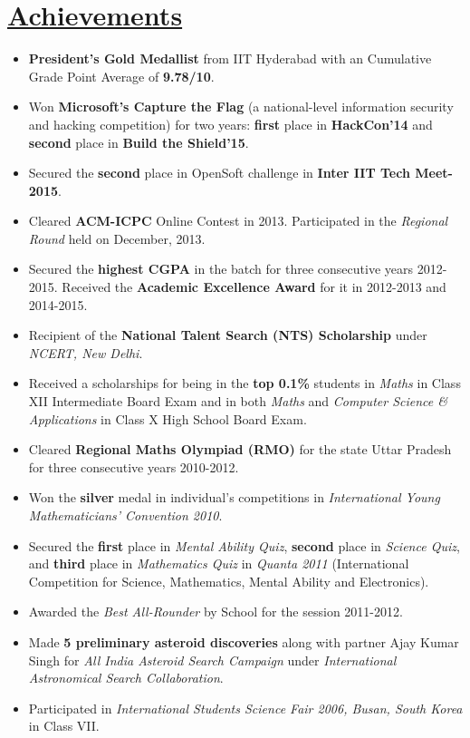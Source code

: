 \documentclass[8pt]{extarticle}
\newcommand{\heading}[1]{
\section*{\color{red}\underline{#1}}
}
\begin{document}
\heading{Achievements}

\begin{itemize}
\item \textbf{President's Gold Medallist} from IIT Hyderabad with an Cumulative Grade Point Average of \textbf{9.78/10}.

\item Won \textbf{Microsoft's Capture the Flag} (a national-level information security and hacking competition) for two years: \textbf{first} place in \textbf{HackCon'14} and \textbf{second} place in \textbf{Build the Shield'15}.

\item Secured the \textbf{second} place in OpenSoft challenge in \textbf{Inter IIT Tech Meet-2015}.

\item Cleared \textbf{ACM-ICPC} Online Contest in 2013. Participated in the \textit{Regional Round} held on December, 2013.

\item Secured the \textbf{highest CGPA} in the batch for three consecutive years 2012-2015. Received the \textbf{Academic Excellence Award} for it in 2012-2013 and 2014-2015.

\item Recipient of the \textbf{National Talent Search (NTS) Scholarship} under \textit{NCERT, New Delhi}.

\item Received a scholarships for being in the \textbf{top 0.1\%} students in \textit{Maths} in Class XII Intermediate Board Exam and in both \textit{Maths} and \textit{Computer Science \& Applications} in Class X High School Board Exam.

\item Cleared \textbf{Regional Maths Olympiad (RMO)} for the state Uttar Pradesh for three consecutive years 2010-2012.

\item Won the \textbf{silver} medal in individual’s competitions in \textit{International Young Mathematicians’ Convention 2010}.

\item Secured the \textbf{first} place in \textit{Mental Ability Quiz}, \textbf{second} place in \textit{Science Quiz}, and \textbf{third} place in \textit{Mathematics Quiz} in \textit{Quanta 2011} (International Competition for Science, Mathematics, Mental Ability and Electronics).

\item Awarded the \textit{Best All-Rounder} by School for the session 2011-2012.
\item Made \textbf{5 preliminary asteroid discoveries} along with partner Ajay Kumar Singh for \textit{All India Asteroid Search Campaign} under \textit{International Astronomical Search Collaboration}.

\item Participated in \textit{International Students Science Fair 2006, Busan, South Korea} in Class VII.
\end{itemize}
\end{document}
